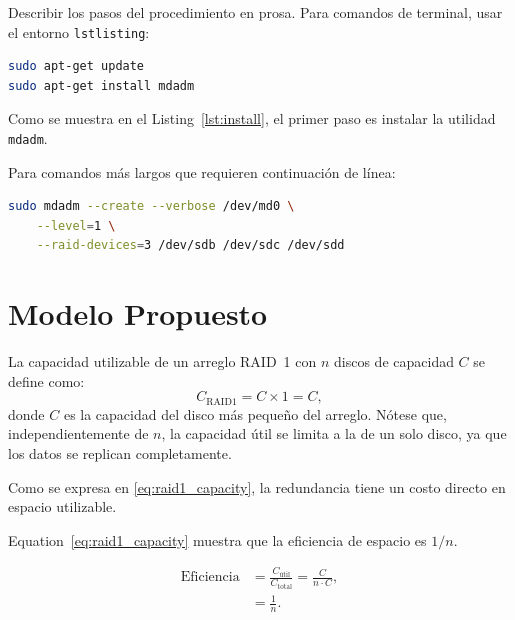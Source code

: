 \documentclass[conference]{IEEEtran}
\begin{document}
Describir los pasos del procedimiento en prosa. Para comandos de terminal,
usar el entorno \texttt{lstlisting}:

\begin{lstlisting}[language=bash, caption={Instalación de mdadm.},
  label={lst:install}]
sudo apt-get update
sudo apt-get install mdadm
\end{lstlisting}

Como se muestra en el Listing~\ref{lst:install}, el primer paso es
instalar la utilidad \texttt{mdadm}.

Para comandos más largos que requieren continuación de línea:

\begin{lstlisting}[language=bash, caption={Creación del arreglo RAID 1.},
  label={lst:raid}]
sudo mdadm --create --verbose /dev/md0 \
    --level=1 \
    --raid-devices=3 /dev/sdb /dev/sdc /dev/sdd
\end{lstlisting}

\section{Modelo Propuesto}
\label{sec:model}

La capacidad utilizable de un arreglo RAID~1 con $n$ discos de capacidad
$C$ se define como:
%
\begin{equation}
  C_{\text{RAID1}} = C \times 1 = C,
  \label{eq:raid1_capacity}
\end{equation}
%
donde $C$ es la capacidad del disco más pequeño del arreglo.
Nótese que, independientemente de $n$, la capacidad útil se limita a la de
un solo disco, ya que los datos se replican completamente.

Como se expresa en \eqref{eq:raid1_capacity}, la redundancia tiene un costo
directo en espacio utilizable.

Equation~\eqref{eq:raid1_capacity} muestra que la eficiencia de espacio
es $1/n$.

\begin{align}
  \text{Eficiencia} &= \frac{C_{\text{útil}}}{C_{\text{total}}}
    = \frac{C}{n \cdot C}, \label{eq:efficiency} \\
  &= \frac{1}{n}. \label{eq:efficiency_simplified}
\end{align}
\end{document}
